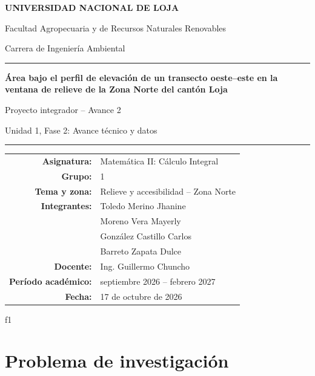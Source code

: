 \documentclass[11pt,a4paper]{article}
\begin{document}
\hypersetup{pageanchor=false}

\begin{titlepage}
\centering
\vspace*{1.6cm}
{\Large\bfseries UNIVERSIDAD NACIONAL DE LOJA\par}
\vspace{0.3cm}
{\large Facultad Agropecuaria y de Recursos Naturales Renovables\par}
{\large Carrera de Ingeniería Ambiental\par}
\vspace{1.2cm}
{\color{unl}\rule{0.82\linewidth}{1.3pt}\par}
\vspace{0.5cm}
{\huge\bfseries Área bajo el perfil de elevación de un transecto oeste--este en la ventana de relieve de la Zona Norte del cantón Loja\par}
\vspace{0.4cm}
{\Large Proyecto integrador -- Avance 2\par}
{\large Unidad 1, Fase 2: Avance técnico y datos\par}
\vspace{0.5cm}
{\color{unl}\rule{0.82\linewidth}{1.3pt}\par}
\vfill
\begin{tabular}{rl}
\textbf{Asignatura:} & Matemática II: Cálculo Integral\\
\textbf{Grupo:} & 1\\
\textbf{Tema y zona:} & Relieve y accesibilidad -- Zona Norte\\
\textbf{Integrantes:} & Toledo Merino Jhanine\\
 & Moreno Vera Mayerly\\
 & González Castillo Carlos\\
 & Barreto Zapata Dulce\\
\textbf{Docente:} & Ing. Guillermo Chuncho\\
\textbf{Período académico:} & septiembre 2026 -- febrero 2027\\
\textbf{Fecha:} & 17 de octubre de 2026\\
\end{tabular}
\vspace{1cm}
\end{titlepage}
\hypersetup{pageanchor=true}

f1

\section{Problema de investigación}
\end{document}
